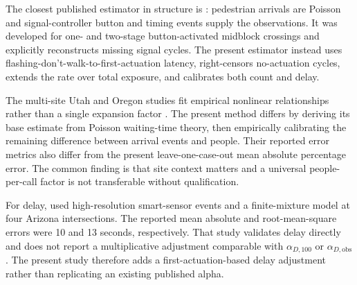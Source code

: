 \documentclass[11pt]{article}
\begin{document}
The closest published estimator in structure is \citet{liWu2021midblockVolume}: pedestrian arrivals are Poisson and signal-controller button and timing events supply the observations. It was developed for one- and two-stage button-activated midblock crossings and explicitly reconstructs missing signal cycles. The present estimator instead uses flashing-don't-walk-to-first-actuation latency, right-censors no-actuation cycles, extends the rate over total exposure, and calibrates both count and delay.

The multi-site Utah and Oregon studies fit empirical nonlinear relationships rather than a single expansion factor \citep{singleton2021pedestrianSignalCounts,kothuri2024activeTransportationCounts,saheli2026pedestrianVolumes}. The present method differs by deriving its base estimate from Poisson waiting-time theory, then empirically calibrating the remaining difference between arrival events and people. Their reported error metrics also differ from the present leave-one-case-out mean absolute percentage error. The common finding is that site context matters and a universal people-per-call factor is not transferable without qualification.

For delay, \citet{karimpour2022pedestrianDelay} used high-resolution smart-sensor events and a finite-mixture model at four Arizona intersections. The reported mean absolute and root-mean-square errors were 10 and 13 seconds, respectively. That study validates delay directly and does not report a multiplicative adjustment comparable with \(\alpha_{D,100}\) or \(\alpha_{D,\mathrm{obs}}\). The present study therefore adds a first-actuation-based delay adjustment rather than replicating an existing published alpha.



\end{document}
